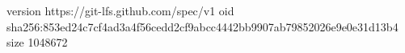 version https://git-lfs.github.com/spec/v1
oid sha256:853ed24c7cf4ad3a4f56cedd2cf9abcc4442bb9907ab79852026e9e0e31d13b4
size 1048672
